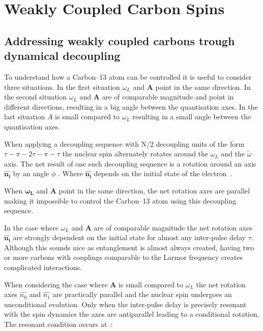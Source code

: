 
\chapter{Weakly Coupled Carbon Spins}

\section{Addressing weakly coupled carbons trough dynamical decoupling}
\label{controllingacarbonthroughdynamicaldecoupling}
To understand how a Carbon--13 atom can be controlled it is useful to consider three situations. In the first situation $\omega_L$ and $\mathbf{A}$ point in the same direction. In the second situation $\omega_L$ and $\mathbf{A}$ are of comparable magnitude and point in different directions, resulting in a big angle between the quantisation axes. In the last situation $A$ is small compared to  $\omega_L$ resulting in a small angle between the quantisation axes.

When applying a decoupling sequence with N\slash 2 decoupling units of the form {$\tau - \pi -2\tau-\pi-\tau$} the nuclear spin alternately rotates around the  $\omega_L$ and the $\tilde{\omega}$ axis. The net result of one such decoupling sequence is a rotation around an axis  $\mathbf{\hat{n_i}}$ by an angle $\phi$  . Where  $\mathbf{\hat{n_i}}$  depends on the initial state of the electron~\citep{Taminiau2012Detection}.

When $\mathbf{\omega_L}$ and $\mathbf{A}$ point in the same direction, the net rotation axes are parallel making it impossible to control the Carbon--13 atom using this decoupling sequence.

In the case where $\omega_L$ and $\mathbf{A}$ are of comparable magnitude the net rotation axes  $\mathbf{\hat{n_i}}$ are strongly dependent on the initial state for almost any inter-pulse delay $\tau$. Although this sounds nice as entanglement is almost always created, having two or more carbons with couplings comparable to the Larmor frequency creates complicated interactions.

When considering the case where $\mathbf{A}$ is small compared to  $\omega_L$ the net rotation axes  $\hat{n_0}$ and $\hat{n_1}$ are practically parallel and the nuclear spin undergoes an unconditional evolution. Only when the inter-pulse delay is precisely resonant with the spin dynamics the axes are antiparallel leading to a conditional rotation. The resonant condition occurs at~\citep{Taminiau2012Detection}:

